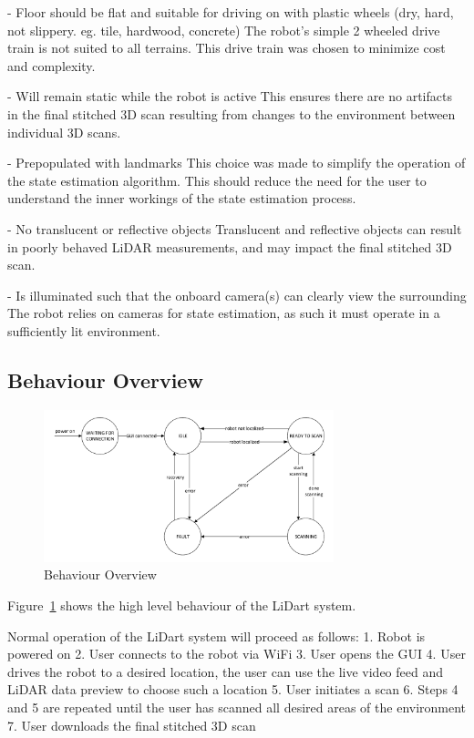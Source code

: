 \documentclass[12pt]{article}
\begin{document}
- Floor should be flat and suitable for driving on with plastic wheels (dry, hard, not slippery. eg. tile, hardwood, concrete)
The robot's simple 2 wheeled drive train is not suited to all terrains. This drive train was chosen to minimize cost and complexity.

- Will remain static while the robot is active
This ensures there are no artifacts in the final stitched 3D scan resulting from changes to the environment between individual 3D scans.

- Prepopulated with landmarks 
This choice was made to simplify the operation of the state estimation algorithm. This should reduce the need for the user to understand the inner workings of the state estimation process.

- No translucent or reflective objects
Translucent and reflective objects can result in poorly behaved LiDAR measurements, and may impact the final stitched 3D scan.

- Is illuminated such that the onboard camera(s) can clearly view the surrounding
The robot relies on cameras for state estimation, as such it must operate in a sufficiently lit environment.

\subsection{Behaviour Overview}

\begin{figure}[H]
\begin{center}
    \includegraphics[width=0.75\textwidth]{Figures/Behaviour Overview.pdf}
\caption{Behaviour Overview}
\label{Fig_BehaviourOverview} 
\end{center}
\end{figure}

Figure~\ref{Fig_BehaviourOverview} shows the high level behaviour of the LiDart system.

Normal operation of the LiDart system will proceed as follows:
1. Robot is powered on
2. User connects to the robot via WiFi
3. User opens the GUI
4. User drives the robot to a desired location, the user can use the live video feed and LiDAR data preview to choose such a location
5. User initiates a scan
6. Steps 4 and 5 are repeated until the user has scanned all desired areas of the environment
7. User downloads the final stitched 3D scan
\end{document}
